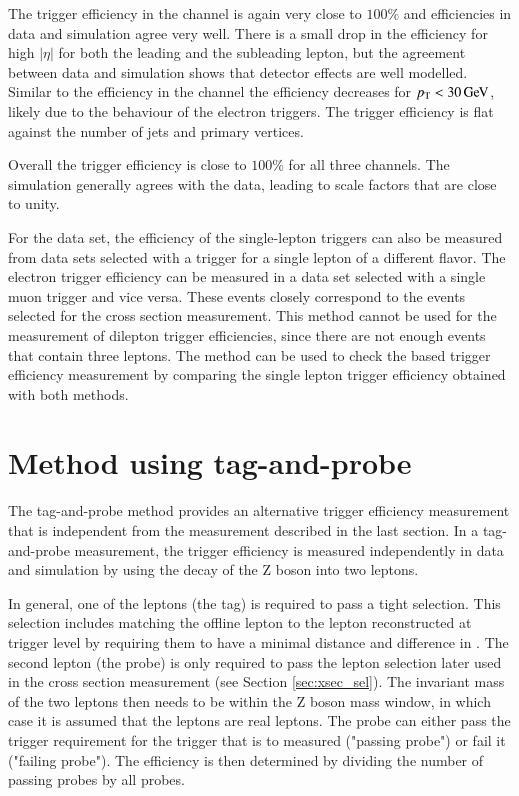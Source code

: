 The trigger efficiency in the \emu channel is again very close to $100\%$ and efficiencies in data and simulation agree very well. There is a small drop in the efficiency for high $|\eta|$ for both the leading and the subleading lepton, but the agreement between data and simulation shows that detector effects are well modelled.
Similar to the efficiency in the \ee channel the efficiency decreases for $p_{\mathrm{T}} < 30 \,\text{Ge\hspace{-.08em}V}$, likely due to the behaviour of the electron triggers.
The trigger efficiency is flat against the number of jets and primary vertices.

Overall the trigger efficiency is close to $100\%$ for all three channels. The simulation generally agrees with the data, leading to scale factors that are close to unity.

For the \emu data set, the efficiency of the single-lepton triggers can also be measured from data sets selected with a trigger for a single lepton of a different flavor. The electron trigger efficiency can be measured in a data set selected with a single muon trigger and vice versa.
These events closely correspond to the events selected for the \ttbar cross section measurement.
This method cannot be used for the measurement of dilepton trigger efficiencies, since there are not enough events that contain three leptons.
The method can be used to check the \ETm based trigger efficiency measurement by comparing the single lepton trigger efficiency obtained with both methods.

\section{Method using tag-and-probe}  %
\label{sec:TriggerTPMethod}

The tag-and-probe method provides an alternative trigger efficiency measurement that is independent from the measurement described in the last section.
In a tag-and-probe measurement, the trigger efficiency is measured independently in data and simulation by using the decay of the Z boson into two leptons.

In general, one of the leptons (the tag) is required to pass a tight selection. This selection includes matching the offline lepton to the lepton reconstructed at trigger level by requiring them to have a minimal distance and difference in \pt. The second lepton (the probe) is only required to pass the lepton selection later used in the \ttbar cross section measurement (see Section \ref{sec:xsec_sel}). The invariant mass of the two leptons then needs to be within the Z boson mass window, in which case it is assumed that the leptons are real leptons.
The probe can either pass the trigger requirement for the trigger that is to measured ("passing probe") or fail it ("failing probe"). The efficiency is then determined by dividing the number of passing probes by all probes.

